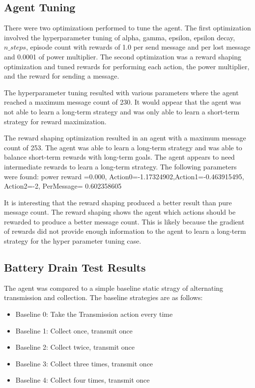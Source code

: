 \documentclass[10pt]{cai}
\begin{document}
\subsection{Agent Tuning}

There were two optimizatiosn performed to tune the agent.
The first optimization involved the hyperparameter tuning of alpha, gamma, epsilon, epsilon decay, $n\_steps$, episode count with rewards of 1.0 per send message and  per lost message and 0.0001 of power multiplier.
The second optimization was a reward shaping optimization and tuned rewards for performing each action, the power multiplier, and the reward for sending a message.

The hyperparameter tuning resulted with various parameters where the agent reached a maximum message count of 230.
It would appear that the agent was not able to learn a long-term strategy and was only able to learn a short-term strategy for reward maximization.

The reward shaping optimization resulted in an agent with a maximum message count of 253.
The agent was able to learn a long-term strategy and was able to balance short-term rewards with long-term goals.
The agent appears to need intermediate rewards to learn a long-term strategy.
The following parameters were found: power reward =0.000, Action0=-1.17324902,Action1=-0.463915495, Action2=-2, PerMessage=	0.602358605

It is interesting that the reward shaping produced a better result than pure message count.
The reward shaping shows the agent which actions should be rewarded to produce a better message count.
This is likely because the gradient of rewards did not provide enough information to the agent to learn a long-term strategy for the hyper parameter tuning case.



\subsection{Battery Drain Test Results}

The agent was compared to a simple baseline static stragy of alternating transmission and collection.
The baseline strategies are as follows:
\begin{itemize}
  \item Baseline 0: Take the Transmission action every time
  \item Baseline 1: Collect once, transmit once
  \item Baseline 2: Collect twice, transmit once
  \item Baseline 3: Collect three times, transmit once
  \item Baseline 4: Collect four times, transmit once
\end{itemize}
\end{document}

